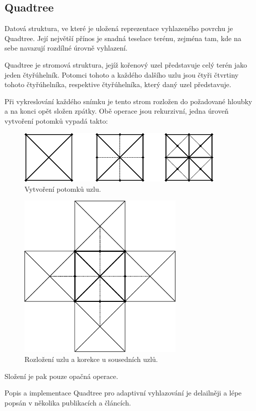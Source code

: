 \documentclass{zcu_sp}
\begin{document}
\subsection{Quadtree}
Datová struktura, ve které je uložená reprezentace vyhlazeného povrchu je
Quadtree. Její největší přínos je snadná teselace terénu, zejména tam, kde na
sebe navazují rozdílné úrovně vyhlazení.

Quadtree je stromová struktura, jejíž kořenový uzel představuje celý terén jako
jeden čtyřúhelník. Potomci tohoto a každého dalšího uzlu jsou čtyři čtvrtiny
tohoto čtyřúhelníka, respektive čtyřúhelníka, který daný uzel představuje.

Při vykreslování každého snímku je tento strom rozložen do požadované
hloubky a na konci opět složen zpátky. Obě operace jsou rekurzivní,
jedna úroveň vytvoření potomků vypadá takto:


\begin{figure}[ht!]
\centering
	\includegraphics[width=10cm]{subd.pdf}
	\caption{Vytvoření potomků uzlu.}
\end{figure}

\begin{figure}[ht!]
\centering
	\includegraphics[width=8cm]{split.pdf}
	\caption{Rozložení uzlu a korekce u sousedních uzlů.}
\end{figure}
Složení je pak pouze opačná operace.

Popis a implementace Quadtree pro adaptivní vyhlazování je delailněji a lépe popsán v několika publikacích a článcích. %
\end{document}
